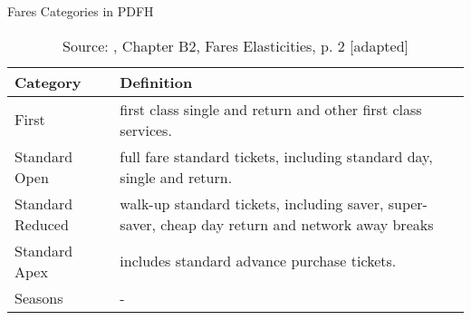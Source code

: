 
\begin{table}[!ht] \centering 
  \caption{Fares Categories in PDFH} 
  \label{tbl:pdfh-fares} 
{\renewcommand\arraystretch{1.25}}
\begin{tabular} {llc}
\toprule
Category         & \multicolumn{2}{p{9cm}}{\raggedright Definition}\\
\hline
First            & \multicolumn{2}{p{9cm}}{\raggedright first class single and return and other first class services.}\\
Standard Open    & \multicolumn{2}{p{9cm}}{\raggedright full fare standard tickets, including standard day, single and return. } \\
Standard Reduced & \multicolumn{2}{p{9cm}}{\raggedright walk-up standard tickets, including saver, super-saver, cheap day return and network away breaks}\\
Standard Apex    & \multicolumn{2}{p{9cm}}{\raggedright includes standard advance purchase tickets. }\\
Seasons          & - \\ 
\bottomrule
\end{tabular}%
\caption*{Source: \cite{pdfh} , Chapter B2, Fares Elasticities, p. 2 [adapted]}
\end{table} 
